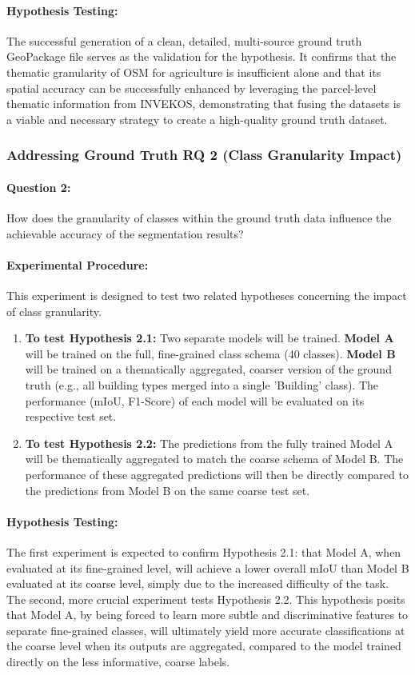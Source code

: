 \documentclass{report}
\begin{document}
\paragraph{Hypothesis Testing:} The successful generation of a clean, detailed, multi-source ground truth GeoPackage file serves as the validation for the hypothesis. It confirms that the thematic granularity of OSM for agriculture is insufficient alone and that its spatial accuracy can be successfully enhanced by leveraging the parcel-level thematic information from INVEKOS, demonstrating that fusing the datasets is a viable and necessary strategy to create a high-quality ground truth dataset.
\subsubsection{Addressing Ground Truth RQ 2 (Class Granularity Impact)}
\label{sec:addressing_gt_rq2}
\paragraph{Question 2:} How does the granularity of classes within the ground truth data influence the achievable accuracy of the segmentation results?
\paragraph{Experimental Procedure:} This experiment is designed to test two related hypotheses concerning the impact of class granularity.
\begin{enumerate}
\item \textbf{To test Hypothesis 2.1:} Two separate models will be trained. \textbf{Model A} will be trained on the full, fine-grained class schema (40 classes). \textbf{Model B} will be trained on a thematically aggregated, coarser version of the ground truth (e.g., all building types merged into a single 'Building' class). The performance (mIoU, F1-Score) of each model will be evaluated on its respective test set.
\item \textbf{To test Hypothesis 2.2:} The predictions from the fully trained Model A will be thematically aggregated to match the coarse schema of Model B. The performance of these aggregated predictions will then be directly compared to the predictions from Model B on the same coarse test set.
\end{enumerate}
\paragraph{Hypothesis Testing:} The first experiment is expected to confirm Hypothesis 2.1: that Model A, when evaluated at its fine-grained level, will achieve a lower overall mIoU than Model B evaluated at its coarse level, simply due to the increased difficulty of the task. The second, more crucial experiment tests Hypothesis 2.2. This hypothesis posits that Model A, by being forced to learn more subtle and discriminative features to separate fine-grained classes, will ultimately yield more accurate classifications at the coarse level when its outputs are aggregated, compared to the model trained directly on the less informative, coarse labels.
\end{document}
